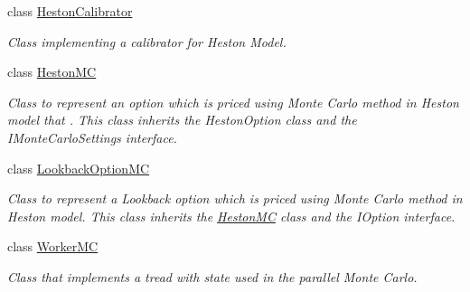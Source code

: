 \begin{DoxyCompactItemize}
class \mbox{\hyperlink{class_heston_model_1_1_classes_1_1_heston_calibrator}{Heston\+Calibrator}}
\begin{DoxyCompactList}\small\item\em Class implementing a calibrator for Heston Model. \end{DoxyCompactList}\item 
class \mbox{\hyperlink{class_heston_model_1_1_classes_1_1_heston_m_c}{Heston\+MC}}
\begin{DoxyCompactList}\small\item\em Class to represent an option which is priced using Monte Carlo method in Heston model that . This class inherits the Heston\+Option class and the I\+Monte\+Carlo\+Settings interface. \end{DoxyCompactList}\item 
class \mbox{\hyperlink{class_heston_model_1_1_classes_1_1_lookback_option_m_c}{Lookback\+Option\+MC}}
\begin{DoxyCompactList}\small\item\em Class to represent a Lookback option which is priced using Monte Carlo method in Heston model. This class inherits the \mbox{\hyperlink{class_heston_model_1_1_classes_1_1_heston_m_c}{Heston\+MC}} class and the I\+Option interface. \end{DoxyCompactList}\item 
class \mbox{\hyperlink{class_heston_model_1_1_classes_1_1_worker_m_c}{Worker\+MC}}
\begin{DoxyCompactList}\small\item\em Class that implements a tread with state used in the parallel Monte Carlo. \end{DoxyCompactList}\end{DoxyCompactItemize}
